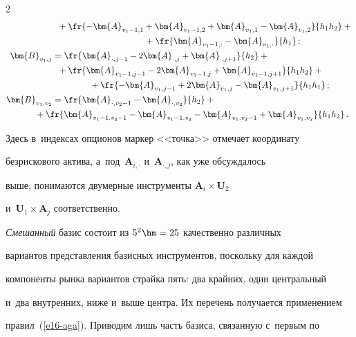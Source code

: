 \begin{multicols}{2}
\begin{align*}
 & \hspace*{2mm}{}+\fr{-\bm{A}_{v_1-1,1} +\bm{A}_{v_1-1,2} +\bm{A}_{v_1,1} -\bm{A}_{v_1,2}}{h_1h_2} +{}\\


&\hspace*{37mm}{}+\fr{\bm{A}_{v_1-1,\cdot}- \bm{A}_{v_1,\cdot}}{h_1}\,;\\


  \bm{B}_{v_1,j}&= \fr{\bm{A}_{\cdot,j-1}- 2\bm{A}_{\cdot,j} +\bm{A}_{\cdot,j+1}}{h_2} +{}\\


&\hspace*{2mm}{}+\fr{\bm{A}_{v_1-1,j-1}-2\bm{A}_{v_1-1,j}+\bm{A}_{v_1-1,j+1}}{h_1h_2}+{}\\


&\hspace*{15mm}{}+\fr{ -\bm{A}_{v_1,j-1}+2\bm{A}_{v_1,j}-\bm{A}_{v_1,j+1}}{h_1h_1}\,;\\


  \bm{B}_{v_1,v_2}&= \fr{\bm{A}_{\cdot,v_2-1}- \bm{A}_{\cdot,v_2}}{h_2} 


+{}\\


&\hspace*{-7mm}{}+\fr{\bm{A}_{v_1-1, v_2-1}- \bm{A}_{v_1-1,v_2} - \bm{A}_{v_1,v_2-1} 


+\bm{A}_{v_1,v_2}}{h_1h_2}\,.


  \end{align*}


    Здесь в~индексах опционов маркер <<точка>> отмечает координату 


безрискового актива, а~под~$\bm{A}_{i,\cdot}$ и~$\bm{A}_{\cdot,j}$, как уже обсуждалось 


выше, понимаются двумерные инструменты $\bm{A}_i\times \bm{U}_2$ 


и~$\bm{U}_1\times \bm{A}_j$ соответственно. 


  


  \textit{Смешанный} базис состоит из $5^2\hm=25$ качественно различных 


вариантов представления базисных инструментов, поскольку для каждой 


компоненты рынка вариантов страйка пять: два крайних, один центральный 


и~два внутренних, ниже и~выше центра. Их перечень получается применением 


правил~(\ref{e16-aga}). Приводим лишь часть базиса, связанную с~первым по 



\end{multicols}
